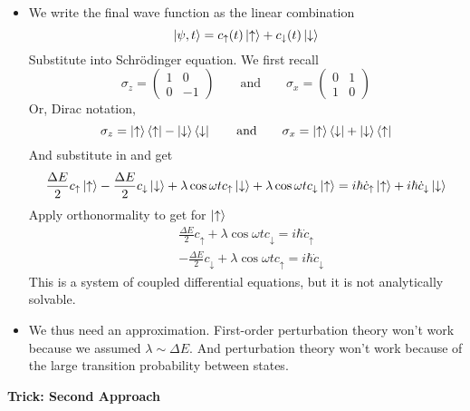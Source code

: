 \documentclass[11pt, a4paper]{article}
\newcommand{\eqtext}[1]{\qquad \text{#1} \qquad}
\newcommand{\Schro}{Schr\"{o}dinger\xspace}
\newcommand{\p}{\psi}  %
\newcommand{\ua}{\uparrow}  %
\newcommand{\da}{\downarrow}  %
\begin{document}
\begin{itemize}
	\item We write the final wave function as the linear combination
	\begin{equation*}
		\ket{\p, t} = c_{\ua}(t)\ket{\ua} + c_{\da}(t)\ket{\da}
	\end{equation*}
	Substitute into \Schro equation. We first recall
	\begin{equation*}
		\sigma_{z} = 
		\begin{pmatrix}
		1 & 0\\
		0 & -1
		\end{pmatrix}
		\eqtext{and}
		\sigma_{x} = 
		\begin{pmatrix}
		0 & 1\\
		1 & 0
		\end{pmatrix}
	\end{equation*}
	Or, Dirac notation,
	\begin{equation*}
		\sigma_{z} = \ket{\ua}\bra{\ua} - \ket{\da}\bra{\da} \eqtext{and} \sigma_{x} = \ket{\ua}\bra{\da} + \ket{\da}\bra{\ua}
	\end{equation*}
	And substitute in and get
	\begin{equation*}
		\frac{\Delta E}{2}c_{\ua}\ket{\ua} - \frac{\Delta E}{2}c_{\da}\ket{\da} + \lambda \cos \omega t c_{\ua}\ket{\da} + \lambda \cos \omega t c_{\da}\ket{\ua} = i \hbar \dot{c}_{\ua}\ket{\ua} + i \hbar \dot{c}_{\da}\ket{\da}
	\end{equation*}
	Apply orthonormality to get for $ \ket{\ua} $
	\begin{align*}
		&\frac{\Delta E}{2}c_{\ua} + \lambda \cos \omega t c_{\da} = i \hbar \dot{c}_{\ua}\\
		&-\frac{\Delta E}{2}c_{\da} + \lambda \cos \omega t c_{\ua} = i \hbar \dot{c}_{\da}
	\end{align*}
	This is a system of coupled differential equations, but it is not analytically solvable.
	
	\item We thus need an approximation. First-order perturbation theory won't work because we assumed $ \lambda \sim \Delta E $. And perturbation theory won't work because of the large transition probability between states.
\end{itemize}
\textbf{Trick: Second Approach}
\end{document}
